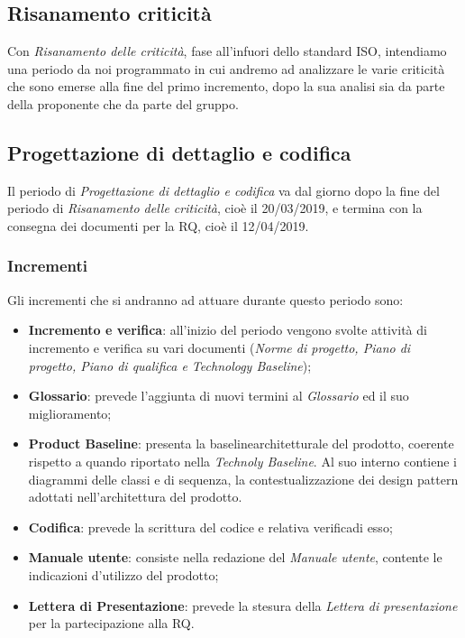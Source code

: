\subsection{Risanamento criticità}
Con \textit{Risanamento delle criticità}, fase all'infuori dello standard ISO, intendiamo una periodo da noi programmato in cui andremo ad analizzare le varie criticità che sono emerse alla fine del primo incremento, dopo la sua analisi sia da parte della proponente che da parte del gruppo. \\

\subsection{Progettazione di dettaglio e codifica}
Il periodo di \textit{Progettazione di dettaglio e codifica} va dal giorno dopo la fine del periodo di \textit{Risanamento delle criticità}, cioè il 20/03/2019, e termina con la consegna dei documenti per la RQ, cioè il 12/04/2019.\\

\subsubsection{Incrementi}
Gli incrementi che si andranno ad attuare durante questo periodo sono:
\begin{itemize}
	\item \textbf{Incremento e verifica}: all'inizio del periodo vengono svolte attività di incremento e verifica su vari documenti (\textit{Norme di progetto, Piano di progetto, Piano di qualifica e Technology Baseline});
	\item \textbf{Glossario}: prevede l'aggiunta di nuovi termini al \textit{Glossario} ed il suo miglioramento;
	\item \textbf{Product Baseline}\glossario: presenta la baseline\glossario architetturale del prodotto, coerente rispetto a quando riportato nella \textit{Technoly Baseline}. Al suo interno contiene i diagrammi delle classi e di sequenza, la contestualizzazione dei design pattern adottati nell'architettura del prodotto. 
	\item \textbf{Codifica}: prevede la scrittura del codice e relativa verifica\glossario di esso;
	\item \textbf{Manuale utente}: consiste nella redazione del \textit{Manuale utente}, contente le indicazioni d'utilizzo del prodotto;
	\item \textbf{Lettera di Presentazione}: prevede la stesura della \textit{Lettera di presentazione} per la partecipazione alla RQ.
\end{itemize}

